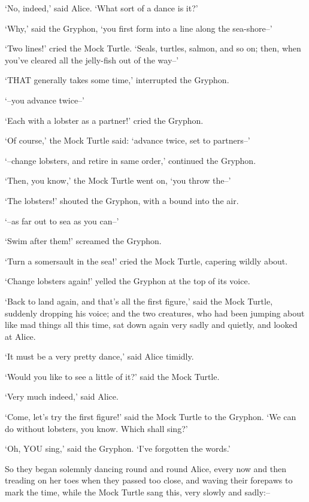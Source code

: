 \documentclass[12pt]{book}
\begin{document}
  `No, indeed,' said Alice.  `What sort of a dance is it?'

  `Why,' said the Gryphon, `you first form into a line along the sea-shore--'

  `Two lines!' cried the Mock Turtle.  `Seals, turtles, salmon, and so on;
then, when you've cleared all the jelly-fish out of the way--'

  `THAT generally takes some time,' interrupted the Gryphon.

  `--you advance twice--'

  `Each with a lobster as a partner!' cried the Gryphon.

  `Of course,' the Mock Turtle said:  `advance twice, set to
partners--'

  `--change lobsters, and retire in same order,' continued the
Gryphon.

  `Then, you know,' the Mock Turtle went on, `you throw the--'

  `The lobsters!' shouted the Gryphon, with a bound into the air.

  `--as far out to sea as you can--'

  `Swim after them!' screamed the Gryphon.

  `Turn a somersault in the sea!' cried the Mock Turtle,
capering wildly about.

  `Change lobsters again!' yelled the Gryphon at the top of its voice.

  `Back to land again, and that's all the first figure,' said the
Mock Turtle, suddenly dropping his voice; and the two creatures,
who had been jumping about like mad things all this time, sat
down again very sadly and quietly, and looked at Alice.

  `It must be a very pretty dance,' said Alice timidly.

  `Would you like to see a little of it?' said the Mock Turtle.

  `Very much indeed,' said Alice.

  `Come, let's try the first figure!' said the Mock Turtle to the
Gryphon.  `We can do without lobsters, you know.  Which shall
sing?'

  `Oh, YOU sing,' said the Gryphon.  `I've forgotten the words.'

  So they began solemnly dancing round and round Alice, every now
and then treading on her toes when they passed too close, and
waving their forepaws to mark the time, while the Mock Turtle
sang this, very slowly and sadly:--
\end{document}
